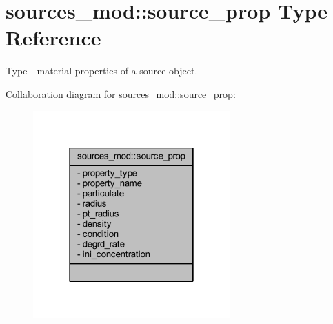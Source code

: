 \hypertarget{structsources__mod_1_1source__prop}{}\section{sources\+\_\+mod\+:\+:source\+\_\+prop Type Reference}
\label{structsources__mod_1_1source__prop}


Type -\/ material properties of a source object.  




Collaboration diagram for sources\+\_\+mod\+:\+:source\+\_\+prop\+:
\nopagebreak
\begin{figure}[H]
\begin{center}
\leavevmode
\includegraphics[width=214pt]{structsources__mod_1_1source__prop__coll__graph}
\end{center}
\end{figure}
